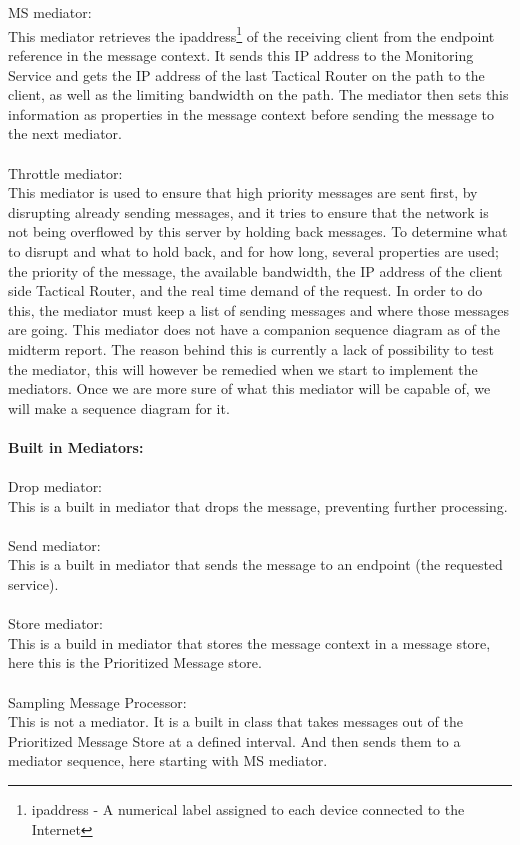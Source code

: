 \\\\
MS mediator:\\
    This mediator retrieves the \gls{ipaddress}\footnote{\gls{ipaddress} - A numerical label assigned to each device connected to the Internet} of the receiving client from the endpoint reference in the message context. It sends this IP address to the Monitoring Service and gets the IP address of the last Tactical Router on the path to the client, as well as the limiting bandwidth on the path. The mediator then sets this information as properties in the message context before sending the message to the next mediator.
\\\\
Throttle mediator:\\
    This mediator is used to ensure that high priority messages are sent first, by disrupting already sending messages, and it tries to ensure that the network is not being overflowed by this server by holding back messages. To determine what to disrupt and what to hold back, and for how long, several properties are used; the priority of the message, the available bandwidth, the IP address of the client side Tactical Router, and the real time demand of the request. In order to do this, the mediator must keep a list of sending messages and where those messages are going. This mediator does not have a companion sequence diagram as of the midterm report. The reason behind this is currently a lack of possibility to test the mediator, this will however be remedied when we start to implement the mediators. Once we are more sure of what this mediator will be capable of, we will make a sequence diagram for it.
\\\\
\textbf{Built in Mediators:}\\\\
Drop mediator:\\
    This is a built in mediator that drops the message, preventing further processing.
\\\\
Send mediator:\\
    This is a built in mediator that sends the message to an endpoint (the requested service).
\\\\
Store mediator:\\
    This is a build in mediator that stores the message context in a message store, here this is the Prioritized Message store.
\\\\
Sampling Message Processor:\\
    This is not a mediator. It is a built in class that takes messages out of the Prioritized Message Store at a defined interval. And then sends them to a mediator sequence, here starting with MS mediator.

